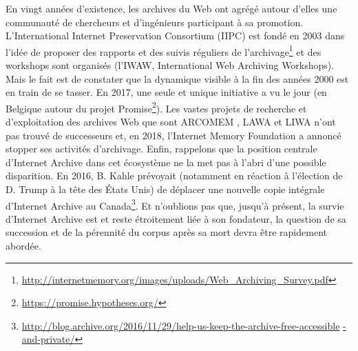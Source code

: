 \documentclass[symmetric,justified,marginals=raggedouter]{tufte-book}
\begin{document}
En vingt années d'existence, les archives du Web ont agrégé autour d'elles une communauté de chercheurs et d'ingénieurs participant à sa promotion. L'International Internet Preservation Consortium (IIPC) est fondé en 2003 dans l'idée de proposer des rapports et des suivis réguliers de l'archivage\footnote{\url{http://internetmemory.org/images/uploads/Web\_Archiving\_Survey.pdf}} et des workshops sont organisés (l'IWAW, International Web Archiving Workshops). Mais le fait est de constater que la dynamique visible à la fin des années 2000 est en train de se tasser. En 2017, une seule et unique initiative a vu le jour (en Belgique autour du projet Promise\footnote{\url{https://promise.hypotheses.org/}}). Les vastes projets de recherche et d'exploitation des archives Web que sont ARCOMEM \citep{risse_arcomem_2014}, LAWA \citep{spaniol_tracking_2012} et LIWA \citep{denev_sharc:_2009} n'ont pas trouvé de successeurs et, en 2018, l'Internet Memory Foundation a annoncé stopper ses activités d'archivage. Enfin, rappelons que la position centrale d'Internet Archive dans cet écosystème ne la met pas à l'abri d'une possible disparition. En 2016, B. Kahle prévoyait (notamment en réaction à l'élection de D. Trump à la tête des États Unis) de déplacer une nouvelle copie intégrale d'Internet Archive au Canada\footnote{\url{http://blog.archive.org/2016/11/29/help-us-keep-the-archive-free-accessible} \url{-and-private/}}. Et n'oublions pas que, jusqu'à présent, la survie d'Internet Archive est et reste étroitement liée à son fondateur, la question de sa succession et de la pérennité du corpus après sa mort devra être rapidement abordée.  
\end{document}
